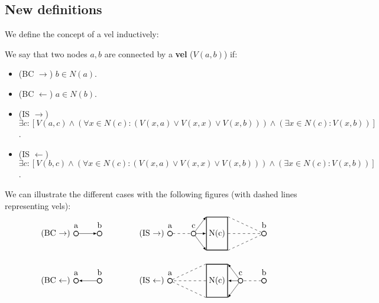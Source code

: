 \subsection{New definitions}
\label{sec:New definitions}
We define the concept of a vel inductively:
\begin{definition}
  We say that two nodes $a,b$ are connected by a \textbf{vel} ($V(a,b)$) if:
  \begin{itemize}
    \item (BC $\rightarrow$) $b \in N(a)$.
    \item (BC $\leftarrow$) $a \in N(b)$.
    \item (IS $\rightarrow$) $\exists c: [V(a,c) \wedge  (\forall x \in N(c):(V(x,a) \vee V(x,x) \vee V(x,b))) \wedge (\exists x \in N(c):V(x,b))]$.
      \item (IS $\leftarrow$) $\exists c: [V(b,c) \wedge  (\forall x \in N(c):(V(x,a) \vee V(x,x) \vee V(x,b))) \wedge (\exists x \in N(c):V(x,b))]$.
  \end{itemize}
\end{definition}
We can illustrate the different cases with the following figures (with dashed lines representing vels):
\[
  \begin{tikzpicture}
    [
    point/.style={thick,circle,draw,inner sep=0pt,minimum size=2mm},
    collection/.style={thick,rectangle,draw,inner sep=0pt,minimum height=14mm, minimum width= 9mm}
    ]
    \node (label) at (1,2) [label=left:(BC $\rightarrow$)] {};
    \node (0) at (1,2) [point,label=above:a] {};
    \node (1) at (2,2) [point,label=above:b] {};
    \draw [-latex] (0) to (1);

    \node (label) at (1,0) [label=left:(BC $\leftarrow$)] {};
    \node (0) at (1,0) [point,label=above:a] {};
    \node (1) at (2,0) [point,label=above:b] {};
    \draw [-latex] (1) to (0);

    \node (label) at (5,2) [label=left:(IS $\rightarrow$)] {};
    \node (0) at (5,2) [point,label=above:a] {};
    \node (1) at (6,2) [point,label=above:c] {};
    \node (2) at (7,2) [collection,label=center:N(c)] {};
    \node (3) at (9,2) [point,label=above:b] {};
    \draw [-, dashed] (0) to (1);
    \draw [-latex] (1) to (2.north west);
    \draw [-latex] (1) to (2.west);
    \draw [-latex] (1) to (2.south west);
    \draw [-, dashed] (2.north east) to (3);
    \draw [-, dashed] (2.east) to (3);
    \draw [-, dashed] (2.south east) to (3);

    \node (label) at (5,0) [label=left:(IS $\leftarrow$)] {};
    \node (0) at (9,0) [point,label=above:b] {};
    \node (1) at (8,0) [point,label=above:c] {};
    \node (2) at (7,0) [collection,label=center:N(c)] {};
    \node (3) at (5,0) [point,label=above:a] {};
    \draw [-, dashed] (0) to (1);
    \draw [-latex] (1) to (2.north east);
    \draw [-latex] (1) to (2.east);
    \draw [-latex] (1) to (2.south east);
    \draw [-, dashed] (2.north west) to (3);
    \draw [-, dashed] (2.west) to (3);
    \draw [-, dashed] (2.south west) to (3);
  \end{tikzpicture}
\]

